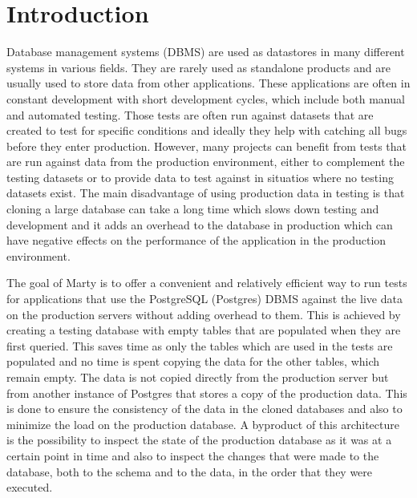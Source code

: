\documentclass[a4paper,12pt,twoside,BCOR=10mm]{scrbook}
\begin{document}
\chapter{Introduction}
\setcounter{page}{1}
Database management systems (DBMS) are used as datastores in many different systems in various fields. They are rarely used as standalone products and are usually used to store data from other applications. These applications are often in constant development with short development cycles, which include both manual and automated testing. Those  tests are often run against datasets that are created to test for specific conditions and ideally they help with catching all bugs before they enter production. However, many projects can benefit from tests that are run against data from the production environment, either to complement the testing datasets or to provide data to test against in situatios where no testing datasets exist. The main disadvantage of using production data in testing is that cloning a large database can take a long time which slows down testing and development and it adds an overhead to the database in production which can have negative effects on the performance of the application in the production environment.

The goal of Marty is to offer a convenient and relatively efficient way to run tests for applications that use the PostgreSQL (Postgres) DBMS against the live data on the production servers without adding overhead to them. This is achieved by creating a testing database with empty tables that are populated  when they are first queried. This saves time as only the tables which are used in the tests are populated and no time is spent copying the data for the other tables, which remain empty. The data is not copied directly from the production server but from another instance of Postgres that stores a copy of the production data. This is done to ensure the consistency of the data in the cloned databases and also to minimize the load on the production database. A byproduct of this architecture is the possibility to inspect the state of the production database as it was at a certain point in time and also to inspect the changes that were made to the database, both to the schema and to the data, in the order that they were executed.

\end{document}
